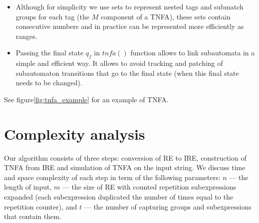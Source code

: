 \documentclass[AMA,STIX1COL]{WileyNJD-v2}
\begin{document}
\begin{itemize}[itemsep=0.2em, topsep=0.5em]
    \item Although for simplicity we use sets to represent nested tags and submatch groups for each tag (the $M$ component of a TNFA),
        these sets contain consecutive numbers and in practice can be represented more efficiently as ranges.

    \item Passing the final state $q_f$ in $tn\!f\!a()$ function allows to link subautomata in a simple and efficient way.
        It allows to avoid tracking and patching of subautomaton transitions that go to the final state
        (when this final state needs to be changed).
    \\[-0.5em]
\end{itemize}

See figure\ref{fig:tnfa_example} for an example of TNFA.


\section{Complexity analysis}\label{section_complexity}

Our algorithm consists of three steps: conversion of RE to IRE,
construction of TNFA from IRE
and simulation of TNFA on the input string.
We discuss time and space complexity of each step
in term of the following parameters:
$n$ --- the length of input,
$m$ --- the size of RE with counted repetition subexpressions expanded
(each subexpression duplicated the number of times equal to the repetition counter),
and $t$ --- the number of capturing groups and subexpressions that contain them.
\\
\end{document}
